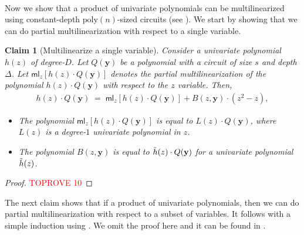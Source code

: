 \documentclass[11pt]{article}
\newtheorem{claim}[theorem]{Claim}
\newcommand{\ml}{\mathsf{ml}}
\begin{document}
\paragraph{}Now we show that a product of univariate polynomials can be multilinearized using constant-depth $\mathrm{poly}(n)$-sized circuits (see ). We start by showing that we can do partial multilinearization with respect to a single variable.

\begin{claim}[Multilinearize a single variable]
\label{claim:multilinearize-one-var}
Consider a univariate polynomial $h(z)$ of degree-$D$. Let $Q(\mathbf{y})$ be a polynomial with a circuit of size $s$ and depth $\Delta$. Let $\ml_{z}[h(z) \cdot Q(\mathbf{y})]$ denotes the partial multilinearization of the polynomial $h(z) \cdot Q(\mathbf{y})$ with respect to the $z$ variable.\newline
Then,
\begin{align*}
    h(z) \cdot Q(\mathbf{y}) \; = \; \ml_{z}[h(z) \cdot Q(\mathbf{y})] + B(z,\mathbf{y}) \cdot (z^{2} - z),
\end{align*}
\begin{itemize}
    \item The polynomial $\ml_{z}[h(z) \cdot Q(\mathbf{y})]$ is equal to $L(z)\cdot  Q(\mathbf{y})$, where $L(z)$ is a degree-$1$ univariate polynomial in $z$.
    \item The polynomial $B(z,\mathbf{y})$ is equal to $\Tilde{h}(z) \cdot Q(\mathbf{y})$ for a univariate polynomial $\Tilde{h}(z)$.
\end{itemize}
\end{claim}
\begin{proof}\textcolor{red}{TOPROVE 10}\end{proof}

The next claim shows that if a product of univariate polynomials, then we can do partial multilinearization with respect to a subset of variables. It follows with a simple induction using . We omit the proof here and it can be found in .
\end{document}
